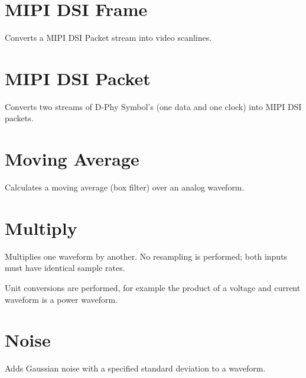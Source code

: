 \pagebreak
\section{MIPI DSI Frame}

Converts a MIPI DSI Packet stream into video scanlines.

\pagebreak
\section{MIPI DSI Packet}

Converts two streams of D-Phy Symbol's (one data and one clock) into MIPI DSI packets.

\pagebreak
\section{Moving Average}

Calculates a moving average (box filter) over an analog waveform.

\pagebreak
\section{Multiply}

Multiplies one waveform by another. No resampling is performed; both inputs must have identical sample rates.

Unit conversions are performed, for example the product of a voltage and current waveform is a power waveform.

\pagebreak
\section{Noise}

Adds Gaussian noise with a specified standard deviation to a waveform.

\pagebreak
